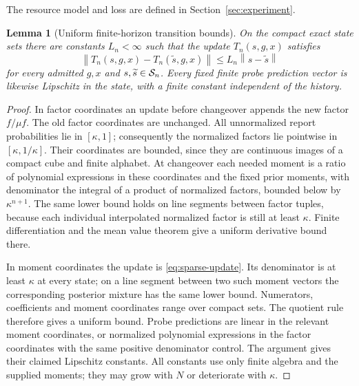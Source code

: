 \documentclass[11pt]{amsart}
\newtheorem{lemma}[theorem]{Lemma}
\theoremstyle{definition}\newtheorem{definition}[theorem]{Definition}
\theoremstyle{remark}\newtheorem{remark}[theorem]{Remark}
\newcommand{\norm}[1]{\left\lVert#1\right\rVert}
\begin{document}
The resource model and loss are defined in Section~\ref{sec:experiment}.

\begin{lemma}[Uniform finite-horizon transition bounds]\label{lem:lipschitz}
On the compact exact state sets there are constants $L_n<\infty$ such
that the update $T_n(s,g,x)$ satisfies
\[
 \norm{T_n(s,g,x)-T_n(\widetilde s,g,x)}
 \le L_n\norm{s-\widetilde s}
\]
for every admitted $g,x$ and $s,\widetilde s\in\mathcal S_n$.
Every fixed finite probe prediction vector is likewise Lipschitz in the
state, with a finite constant independent of the history.
\end{lemma}
\begin{proof}
In factor coordinates an update before changeover appends the new factor
$f/\mu f$. The old factor coordinates are unchanged. All unnormalized
report probabilities lie in $[\kappa,1]$; consequently the normalized
factors lie pointwise in $[\kappa,1/\kappa]$. Their coordinates are bounded,
since they are continuous images of a compact cube and finite alphabet.
At changeover each needed moment is a ratio of polynomial expressions in
these coordinates and the fixed prior moments, with denominator the
integral of a product of normalized factors, bounded below by $\kappa^{n+1}$.
The same lower bound holds on line segments between factor tuples,
because each individual interpolated normalized factor is still at least
$\kappa$. Finite differentiation and the mean value theorem give a
uniform derivative bound there.

In moment coordinates the update is \eqref{eq:sparse-update}. Its
denominator is at least $\kappa$ at every state; on a line segment between
two such moment vectors the corresponding posterior mixture has the same
lower bound. Numerators, coefficients and moment coordinates range over
compact sets. The quotient rule therefore gives a uniform bound. Probe
predictions are linear in the relevant moment coordinates, or normalized
polynomial expressions in the factor coordinates with the same positive
denominator control. The argument gives their claimed Lipschitz constants.
All constants use only finite algebra and the supplied moments; they may
grow with $N$ or deteriorate with $\kappa$.
\end{proof}
\end{document}
